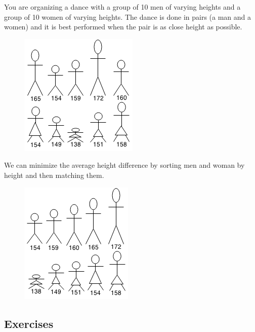 \documentclass[11pt,oneside]{book}
\makeatletter
\def\maxwidth#1{\ifdim\Gin@nat@width>#1 #1\else\Gin@nat@width\fi}
\makeatother
\begin{document}
You are organizing a dance with a group of 10 men of varying heights and a group of 10 women of varying heights. The dance is done in pairs (a man and a women) and it is best performed when the pair is as close height as possible.

\vspace{5px}\begin{figure}[H]\centering
        \includegraphics[width=0.66\maxwidth{\textwidth}]{couplematch.png}
        \end{figure}

We can minimize the average height difference by sorting men and woman by height and then matching them.

\vspace{5px}\begin{figure}[H]\centering
        \includegraphics[width=0.66\maxwidth{\textwidth}]{couplematch2.png}
        \end{figure}

\subsection{Exercises}
\end{document}
